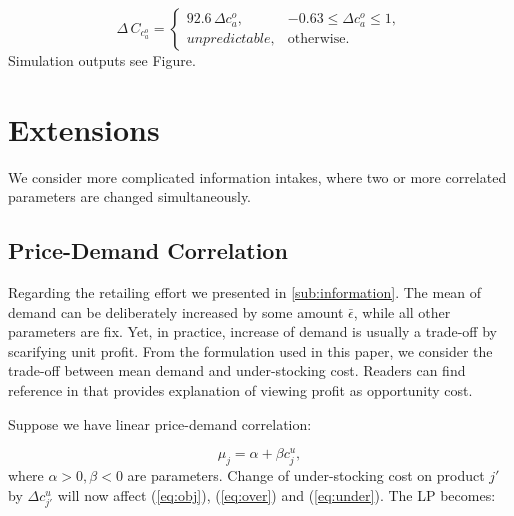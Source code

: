 \documentclass[a4paper,11pt]{article}
\begin{document}
\[
    \Delta \, C_{c_a^o} = 
    \begin{cases}
        92.6 \, \Delta c_a^o, & -0.63 \leq \Delta c_a^o \leq 1,\\
        unpredictable, & \text{otherwise}.
    \end{cases}
\]
Simulation outputs see Figure.

\section{Extensions}
\label{se:extensions}

We consider more complicated information intakes, where two or more correlated parameters are changed simultaneously.

\subsection{Price-Demand Correlation}
Regarding the retailing effort we presented in \ref{sub:information}. The mean of demand can be deliberately increased by some amount $\bar{\epsilon}$, while all other parameters are fix. Yet, in practice, increase of demand is usually a trade-off by scarifying unit profit. From the formulation used in this paper, we consider the trade-off between mean demand and under-stocking cost. Readers can find reference in \cite{Ch12,Po02,SPP98} that provides explanation of viewing profit as opportunity cost.

Suppose we have linear price-demand correlation:

\[
    \mu_j = \alpha + \beta c_j^u,
\]
where $\alpha > 0, \beta < 0$ are parameters. Change of under-stocking cost on product $j'$ by $\Delta c_{j'}^u$ will now affect (\ref{eq:obj}), (\ref{eq:over}) and (\ref{eq:under}). The LP becomes:
\end{document}
